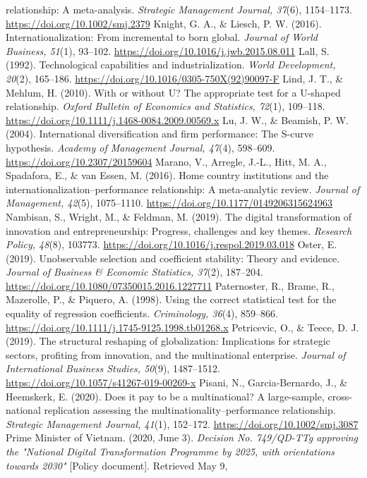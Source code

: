 \documentclass[12pt,a4paper]{article}
\begin{document}
relationship: A meta-analysis. \emph{Strategic Management Journal,
37}(6), 1154--1173. \url{https://doi.org/10.1002/smj.2379} Knight, G.
A., \& Liesch, P. W. (2016). Internationalization: From incremental to
born global. \emph{Journal of World Business, 51}(1), 93--102.
\url{https://doi.org/10.1016/j.jwb.2015.08.011} Lall, S. (1992).
Technological capabilities and industrialization. \emph{World
Development, 20}(2), 165--186.
\url{https://doi.org/10.1016/0305-750X(92)90097-F} Lind, J. T., \&
Mehlum, H. (2010). With or without U? The appropriate test for a
U-shaped relationship. \emph{Oxford Bulletin of Economics and
Statistics, 72}(1), 109--118.
\url{https://doi.org/10.1111/j.1468-0084.2009.00569.x} Lu, J. W., \&
Beamish, P. W. (2004). International diversification and firm
performance: The S-curve hypothesis. \emph{Academy of Management
Journal, 47}(4), 598--609. \url{https://doi.org/10.2307/20159604}
Marano, V., Arregle, J.-L., Hitt, M. A., Spadafora, E., \& van Essen, M.
(2016). Home country institutions and the
internationalization--performance relationship: A meta-analytic review.
\emph{Journal of Management, 42}(5), 1075--1110.
\url{https://doi.org/10.1177/0149206315624963} Nambisan, S., Wright, M.,
\& Feldman, M. (2019). The digital transformation of innovation and
entrepreneurship: Progress, challenges and key themes. \emph{Research
Policy, 48}(8), 103773.
\url{https://doi.org/10.1016/j.respol.2019.03.018} Oster, E. (2019).
Unobservable selection and coefficient stability: Theory and evidence.
\emph{Journal of Business \& Economic Statistics, 37}(2), 187--204.
\url{https://doi.org/10.1080/07350015.2016.1227711} Paternoster, R.,
Brame, R., Mazerolle, P., \& Piquero, A. (1998). Using the correct
statistical test for the equality of regression coefficients.
\emph{Criminology, 36}(4), 859--866.
\url{https://doi.org/10.1111/j.1745-9125.1998.tb01268.x} Petricevic, O.,
\& Teece, D. J. (2019). The structural reshaping of globalization:
Implications for strategic sectors, profiting from innovation, and the
multinational enterprise. \emph{Journal of International Business
Studies, 50}(9), 1487--1512.
\url{https://doi.org/10.1057/s41267-019-00269-x} Pisani, N.,
Garcia-Bernardo, J., \& Heemskerk, E. (2020). Does it pay to be a
multinational? A large-sample, cross-national replication assessing the
multinationality--performance relationship. \emph{Strategic Management
Journal, 41}(1), 152--172. \url{https://doi.org/10.1002/smj.3087} Prime
Minister of Vietnam. (2020, June 3). \emph{Decision No. 749/QD-TTg
approving the "National Digital Transformation Programme by 2025, with
orientations towards 2030"} {[}Policy document{]}. Retrieved May 9,
\end{document}
